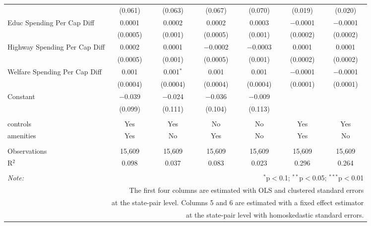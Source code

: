 \begin{table}[!htbp]
\begin{tabular}{@{\extracolsep{5pt}}lcccccc}
  & (0.061) & (0.063) & (0.067) & (0.070) & (0.019) & (0.020) \\ 
  Educ Spending Per Cap Diff & 0.0001 & 0.0002 & 0.0002 & 0.0003 & $-$0.0001 & $-$0.0001 \\ 
  & (0.0005) & (0.001) & (0.0005) & (0.001) & (0.0002) & (0.0002) \\ 
  Highway Spending Per Cap Diff & 0.0002 & 0.0001 & $-$0.0002 & $-$0.0003 & 0.0001 & 0.0001 \\ 
  & (0.0005) & (0.001) & (0.0005) & (0.001) & (0.0002) & (0.0002) \\ 
  Welfare Spending Per Cap Diff & 0.001 & 0.001$^{*}$ & 0.001 & 0.001 & $-$0.0001 & $-$0.0001 \\ 
  & (0.0004) & (0.0004) & (0.0004) & (0.0004) & (0.0001) & (0.0001) \\ 
  Constant & $-$0.039 & $-$0.024 & $-$0.036 & $-$0.009 &  &  \\ 
  & (0.099) & (0.111) & (0.104) & (0.113) &  &  \\ 
 \hline \\[-1.8ex] 
controls & Yes & Yes & No & No & Yes & Yes \\ 
amenities & Yes & No & Yes & No & Yes & No \\ 
\hline \\[-1.8ex] 
Observations & 15,609 & 15,609 & 15,609 & 15,609 & 15,609 & 15,609 \\ 
R$^{2}$ & 0.098 & 0.037 & 0.083 & 0.023 & 0.296 & 0.264 \\ 
\hline 
\hline \\[-1.8ex] 
\textit{Note:}  & \multicolumn{6}{r}{$^{*}$p$<$0.1; $^{**}$p$<$0.05; $^{***}$p$<$0.01} \\ 
 & \multicolumn{6}{r}{The first four columns are estimated with OLS and clustered standard errors} \\ 
 & \multicolumn{6}{r}{at the state-pair level. Columns 5 and 6 are estimated with a fixed effect estimator} \\ 
 & \multicolumn{6}{r}{at the state-pair level with homoskedastic standard errors.} \\ 
\end{tabular} 
\end{table} 
